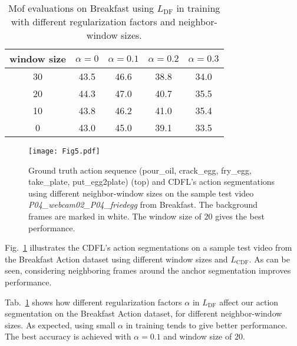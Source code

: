\documentclass[10pt,twocolumn,letterpaper]{article}
\begin{document}
\begin{table}[t]
\begin{center}
\begin{tabular}{|c|c|c|c|c|}
\hline  window size & $\alpha=0$ & $\alpha=0.1$ & $\alpha=0.2$ & $\alpha=0.3$\\
\hline 30 & 43.5& 46.6 & 38.8 & 34.0\\
\hline 20 & 44.3& 47.0 & 40.7 & 35.5\\
\hline 10 & 43.8& 46.2 & 41.0 & 35.4\\
\hline 0 & 43.0& 45.0 & 39.1 & 33.5\\
\hline
\end{tabular}
\end{center}
\caption{Mof evaluations on Breakfast using $L_{\text{DF}}$ in training with different regularization factors and neighbor-window sizes.}
\label{table:Different regularization}
\end{table}


\begin{figure}
\centering
\texttt{[image: Fig5.pdf]}
\caption{Ground truth action sequence (\textcolor{mygold}{pour\_oil}, \textcolor{mymaroon}{crack\_egg}, \textcolor{mygreen}{fry\_egg}, \textcolor{myviolet}{take\_plate}, \textcolor{myaquamarine}{put\_egg2plate}) (top) and CDFL's action segmentations using different neighbor-window sizes on the sample test video \textit{P04\_webcam02\_P04\_friedegg} from Breakfast. The background frames are marked in white. The window size of $20$ gives the best performance.}
\label{fig:diff_win}
\end{figure}

Fig.~\ref{fig:diff_win} illustrates the CDFL's action segmentations on a sample test video from the Breakfast Action dataset using different window sizes and $L_\text{CDF}$. As can be seen, considering neighboring frames around the anchor segmentation improves performance. 

Tab.~\ref{table:Different regularization} shows how different regularization factors $\alpha$  in $L_\text{DF}$ affect our action segmentation on the Breakfast Action dataset, for different neighbor-window sizes. As expected, using small $\alpha$ in training tends to give better performance. The best accuracy is achieved with $\alpha = 0.1$ and window size of $20$.
\end{document}
